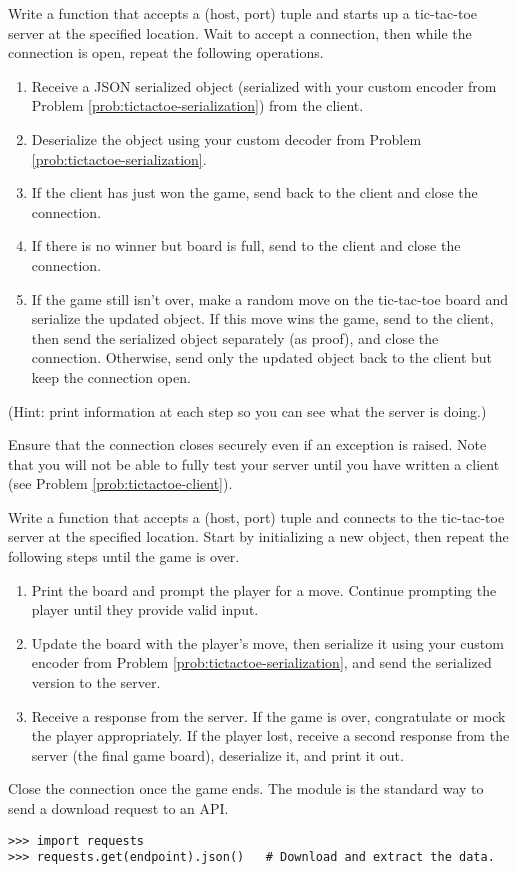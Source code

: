 Write a function that accepts a (host, port) tuple and starts up a tic-tac-toe server at the specified location.
Wait to accept a connection, then while the connection is open, repeat the following operations.
\begin{enumerate}
\item Receive a JSON serialized  object (serialized with your custom encoder from Problem \ref{prob:tictactoe-serialization}) from the client.
\item Deserialize the  object using your custom decoder from Problem \ref{prob:tictactoe-serialization}.
\item If the client has just won the game, send  back to the client and close the connection.
\item If there is no winner but board is full, send  to the client and close the connection.
\item If the game still isn't over, make a random move on the tic-tac-toe board and serialize the updated  object.
If this move wins the game, send  to the client, then send the serialized object separately (as proof), and close the connection.
Otherwise, send only the updated  object back to the client but keep the connection open.
\end{enumerate}
(Hint: print information at each step so you can see what the server is doing.)

Ensure that the connection closes securely even if an exception is raised.
Note that you will not be able to fully test your server until you have written a client (see Problem \ref{prob:tictactoe-client}).
\label{prob:tictactoe-server}

Write a function that accepts a (host, port) tuple and connects to the tic-tac-toe server at the specified location.
Start by initializing a new  object, then repeat the following steps until the game is over.
\begin{enumerate}
\item Print the board and prompt the player for a move.
Continue prompting the player until they provide valid input.
\item Update the board with the player's move, then serialize it using your custom encoder from Problem \ref{prob:tictactoe-serialization}, and send the serialized version to the server.
\item Receive a response from the server.
If the game is over, congratulate or mock the player appropriately.
If the player lost, receive a second response from the server (the final game board), deserialize it, and print it out.
\end{enumerate}
Close the connection once the game ends.
\label{prob:tictactoe-client}
The  module is the standard way to send a download request to an API.
\begin{lstlisting}
>>> import requests
>>> requests.get(endpoint).json()   # Download and extract the data.
\end{lstlisting}

